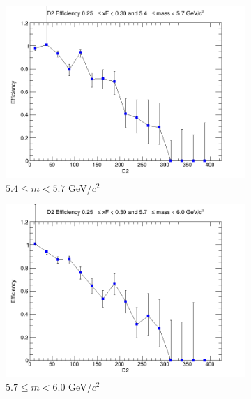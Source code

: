 \documentclass[11pt]{article}
\begin{document}
\begin{figure}[p]
\begin{subfigure}[b]{0.32\textwidth}
        \includegraphics[width=\textwidth]{./kTrackerEfficiencyPlots/D2_Efficiency_xF5_mass4.png}
        \caption{$5.4 \leq m < 5.7$ GeV/$c^2$}
    \end{subfigure}\hfill
    \begin{subfigure}[b]{0.32\textwidth}
        \centering
        \includegraphics[width=\textwidth]{./kTrackerEfficiencyPlots/D2_Efficiency_xF5_mass5.png}
        \caption{$5.7 \leq m < 6.0$ GeV/$c^2$}
    \end{subfigure}\vspace{0.5cm}
    \begin{subfigure}[b]{0.32\textwidth}
        \centering

\end{subfigure}
\end{figure}
\end{document}

